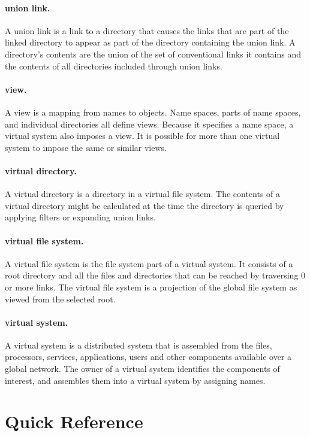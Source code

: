 \paragraph{union link.}  A union link is a link to a directory that
causes the links that are part of the linked directory to appear as
part of the directory containing the union link.  A directory's
contents are the union of the set of conventional links it contains
and the contents of all directories included through union links.

\paragraph{view.}  A view is a mapping from names to objects.  Name
spaces, parts of name spaces, and individual directories all define
views.  Because it specifies a name space, a virtual system also
imposes a view.  It is possible for more than one virtual system to
impose the same or similar views.

\newpage
\paragraph{virtual directory.}  A virtual directory is a directory in
a virtual file system.  The contents of a virtual directory might be
calculated at the time the directory is queried by applying filters or
expanding union links.

\paragraph{virtual file system.}  A virtual file system is the file
system part of a virtual system.  It consists of a root directory and
all the files and directories that can be reached by traversing 0 or
more links.  The virtual file system is a projection of the
global file system as viewed from the selected root.

\paragraph{virtual system.}  A virtual system is a distributed system
that is assembled from the files, processors, services, applications,
users and other components available over a global network.  The owner
of a virtual system identifies the components of interest, and
assembles them into a virtual system by assigning names.  

\newpage
\section{Quick Reference}

